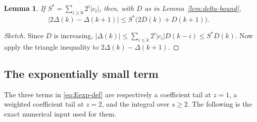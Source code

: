 \documentclass[11pt]{amsart}
\theoremstyle{plain}
\newtheorem{lemma}[theorem]{Lemma}
\theoremstyle{definition}
\newcommand{\abs}[1]{\lvert #1\rvert}
\begin{document}
\begin{lemma}\label{lem:Delta-bound}
If $S^*=\sum_{i\geq0}2^i\abs{c_i}$, then, with $D$ as in
Lemma~\ref{lem:delta-bound},
\begin{equation}\label{eq:Delta-bound}
 \abs{2\Delta(k)-\Delta(k+1)}
 \leq S^*\bigl(2D(k)+D(k+1)\bigr).
\end{equation}
\end{lemma}

\begin{proof}[Sketch]
Since $D$ is increasing, $\abs{\Delta(k)}\leq\sum_{i\leq k}2^i\abs{c_i}D(k-i)
\leq S^*D(k)$. Now apply the triangle inequality to
$2\Delta(k)-\Delta(k+1)$.
\end{proof}

\subsection{The exponentially small term}\label{subsec:Eexp}

The three terms in \eqref{eq:Eexp-def} are respectively a coefficient tail at
$z=1$, a weighted coefficient tail at $z=2$, and the integral over $s\geq2$.
The following is the exact numerical input used for them.
\end{document}
